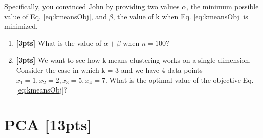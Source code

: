\documentclass[12pt]{article}
\begin{document}
\begin{enumerate}
    Specifically, you convinced John by providing two values $\alpha$, the minimum possible value of Eq. \eqref{eq:kmeansObj}, and $\beta$, the value of k when Eq. \eqref{eq:kmeansObj} is minimized. 

    \begin{enumerate}[label*=\arabic*.]

    
    \item \textbf{[3pts]} What is the value of $\alpha + \beta$ when $n=100$?

    \begin{tcolorbox}[fit,height=1cm, width=2cm, blank, borderline={1pt}{-2pt},nobeforeafter]
    \end{tcolorbox}
    

    \item \textbf{[3pts]} We want to see how k-means clustering works on a single dimension. Consider the case in which k = 3 and we have 4 data points $x_1=1, x_2 = 2, x_3 = 5, x_4 =7$. What is the optimal value of the objective Eq. \eqref{eq:kmeansObj}? 
    
    \begin{tcolorbox}[fit,height=1cm, width=2cm, blank, borderline={1pt}{-2pt},nobeforeafter]
    \end{tcolorbox}
    
    \end{enumerate}
    
    
\end{enumerate}

\clearpage
\section{PCA [13pts]}
\end{document}

